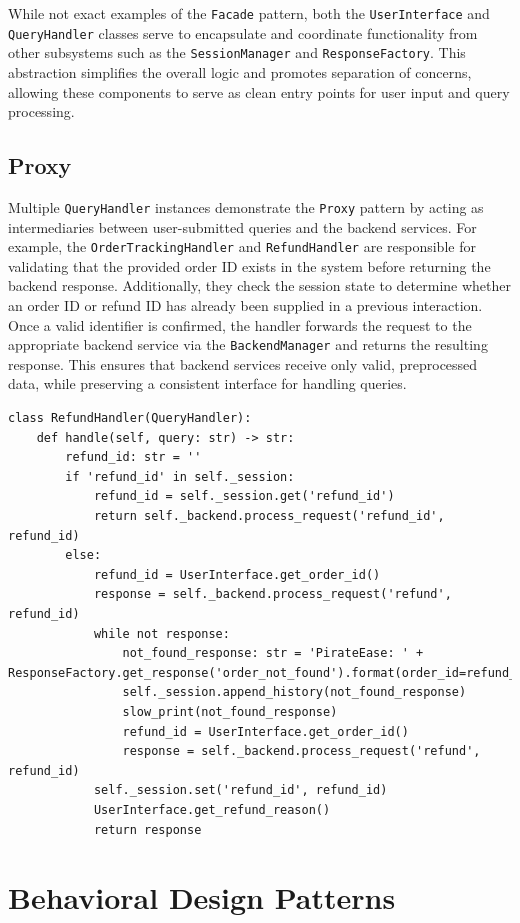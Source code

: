 \documentclass[11pt]{article}
\begin{document}
%
While not exact examples of the \texttt{Facade} pattern, both the \texttt{UserInterface} and \texttt{QueryHandler} classes serve to encapsulate and coordinate functionality from other subsystems such as the \texttt{SessionManager} and \texttt{ResponseFactory}. This abstraction simplifies the overall logic and promotes separation of concerns, allowing these components to serve as clean entry points for user input and query processing.
%
\subsection{Proxy}
%
Multiple \texttt{QueryHandler} instances demonstrate the \texttt{Proxy} pattern by acting as intermediaries between user-submitted queries and the backend services. For example, the \texttt{OrderTrackingHandler} and \texttt{RefundHandler} are responsible for validating that the provided order ID exists in the system before returning the backend response. Additionally, they check the session state to determine whether an order ID or refund ID has already been supplied in a previous interaction. Once a valid identifier is confirmed, the handler forwards the request to the appropriate backend service via the \texttt{BackendManager} and returns the resulting response. This ensures that backend services receive only valid, preprocessed data, while preserving a consistent interface for handling queries.
%
\begin{lstlisting}
class RefundHandler(QueryHandler):
    def handle(self, query: str) -> str:
        refund_id: str = ''
        if 'refund_id' in self._session:
            refund_id = self._session.get('refund_id')
            return self._backend.process_request('refund_id', refund_id)
        else:
            refund_id = UserInterface.get_order_id()
            response = self._backend.process_request('refund', refund_id)
            while not response:
                not_found_response: str = 'PirateEase: ' + ResponseFactory.get_response('order_not_found').format(order_id=refund_id)
                self._session.append_history(not_found_response)
                slow_print(not_found_response)
                refund_id = UserInterface.get_order_id()
                response = self._backend.process_request('refund', refund_id)
            self._session.set('refund_id', refund_id)
            UserInterface.get_refund_reason()
            return response
\end{lstlisting}
%
\section{Behavioral Design Patterns}
\end{document}
